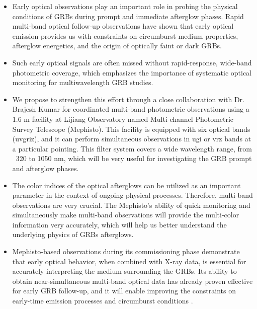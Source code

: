 \begin{itemize}
    \itemsep0em 
    \item Early optical observations play an important role in probing the physical conditions of GRBs during prompt and immediate afterglow phases. Rapid multi-band optical follow-up observations have shown that early optical emission provides us with constraints on circumburst medium properties, afterglow energetics, and the origin of optically faint or dark GRBs.
    \item Such early optical signals are often missed without rapid-response, wide-band photometric coverage, which emphasizes the importance of systematic optical monitoring for multiwavelength GRB studies.
    \item We propose to strengthen this effort through a close collaboration with Dr. Brajesh Kumar for coordinated multi-band photometric observations using a 1.6 m facility at Lijiang Observatory named Multi-channel Photometric Survey Telescope (Mephisto). This facility is equipped with six optical bands (uvgriz), and it can perform simultaneous observations in ugi or vrz bands at a particular pointing. This filter system covers a wide wavelength range, from ~320 to 1050 nm, which will be very useful for investigating the GRB prompt and afterglow phases. 	
    \item The color indices of the optical afterglows can be utilized as an important parameter in the context of ongoing physical processes. Therefore, multi-band observations are very crucial. The Mephisto’s ability of quick monitoring and simultaneously make multi-band observations will provide the multi-color information very accurately, which will help us better understand the underlying physics of GRBs afterglows.
    \item Mephisto-based observations during its commissioning phase demonstrate that early optical behavior, when combined with X-ray data, is essential for accurately interpreting the medium surrounding the GRBs. Its ability to obtain near-simultaneous multi-band optical data has already proven effective for early GRB follow-up, and it will enable improving the constraints on early-time emission processes and circumburst conditions \cite{cheng2024simultaneousmultibandphotometryearly} \cite{du2025multiwavelengthanalysisgrb250101a}.
\end{itemize}

